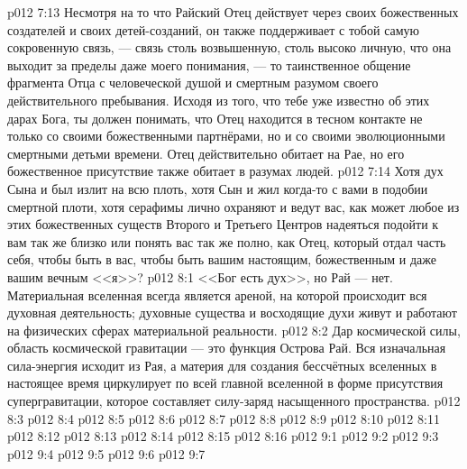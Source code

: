 \vs p012 7:13 \pc Несмотря на то что Райский Отец действует через своих божественных создателей и своих детей\hyp{}созданий, он также поддерживает с тобой самую сокровенную связь, --- связь столь возвышенную, столь высоко личную, что она выходит за пределы даже моего понимания, --- то таинственное общение фрагмента Отца с человеческой душой и смертным разумом своего действительного пребывания. Исходя из того, что тебе уже известно об этих дарах Бога, ты должен понимать, что Отец находится в тесном контакте не только со своими божественными партнёрами, но и со своими эволюционными смертными детьми времени. Отец действительно обитает на Рае, но его божественное присутствие также обитает в разумах людей.
\vs p012 7:14 Хотя дух Сына и был излит на всю плоть, хотя Сын и жил когда\hyp{}то с вами в подобии смертной плоти, хотя серафимы лично охраняют и ведут вас, как может любое из этих божественных существ Второго и Третьего Центров надеяться подойти к вам так же близко или понять вас так же полно, как Отец, который отдал часть себя, чтобы быть в вас, чтобы быть вашим настоящим, божественным и даже вашим вечным <<я>>?
\vs p012 8:1 <<Бог есть дух>>, но Рай --- нет. Материальная вселенная всегда является ареной, на которой происходит вся духовная деятельность; духовные существа и восходящие духи живут и работают на физических сферах материальной реальности.
\vs p012 8:2 \pc Дар космической силы, область космической гравитации --- это функция Острова Рай. Вся изначальная сила\hyp{}энергия исходит из Рая, а материя для создания бессчётных вселенных в настоящее время циркулирует по всей главной вселенной в форме присутствия супергравитации, которое составляет силу\hyp{}заряд насыщенного пространства.
\vs p012 8:3 
\vs p012 8:4 \pc 
\vs p012 8:5 
\vs p012 8:6 \pc 
\vs p012 8:7 
\vs p012 8:8 
\vs p012 8:9 \pc 
\vs p012 8:10 
\vs p012 8:11 
\vs p012 8:12 
\vs p012 8:13 \pc 
\vs p012 8:14 \pc 
\vs p012 8:15 
\vs p012 8:16 
\vs p012 9:1 
\vs p012 9:2 \pc 
\vs p012 9:3 
\vs p012 9:4 
\vs p012 9:5 
\vs p012 9:6 \pc 
\vsetoff
\vs p012 9:7 
\quizlink
